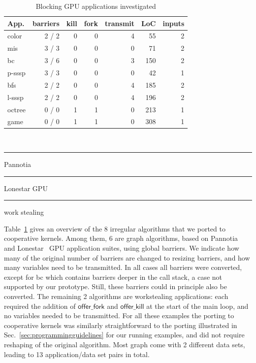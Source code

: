 \documentclass[numbers,nocopyrightspace,10pt]{sigplanconf}
\newcommand\crule[3][black]{\textcolor{#1}{\rule{#2}{#3}}}
\newcommand{\mytablong}{Table~}
\newcommand{\mysec}{Sec.~}
\newcommand{\offerfork}{\mathsf{offer\_fork}}
\newcommand{\offerkill}{\mathsf{offer\_kill}}
\begin{document}
\begin{table}
\small
\centering
\begin{tabular}{ l r r r r r r}
App. & barriers & kill & fork & transmit & LoC & inputs\\
\hline
\rowcolor{Gray1}
color & 2 / 2 & 0 & 0 & 4 & 55 & 2\\
\rowcolor{Gray1}
mis & 3 / 3 & 0 & 0 & 0 & 71 & 2\\
\rowcolor{Gray1}
bc & 3 / 6 & 0 & 0 & 3 & 150 & 2\\
\rowcolor{Gray1}
p-sssp & 3 / 3 & 0 & 0 & 0  & 42 & 1\\
\rowcolor{Gray2}
bfs & 2 / 2 & 0 & 0  & 4  & 185 & 2\\
\rowcolor{Gray2}
l-sssp & 2 / 2 & 0 & 0  & 4  & 196 & 2\\
\rowcolor{Gray3}
octree & 0 / 0 & 1 & 1 & 0 & 213 & 1 \\
\rowcolor{Gray3}
game & 0 / 0 & 1 & 1 & 0 & 308 & 1 \\
\end{tabular} \\
\vspace{.2cm}
\crule[Gray1]{.2cm}{.2cm} Pannotia \hspace{.4cm} \crule[Gray2]{.2cm}{.2cm} Lonestar GPU  \hspace{.4cm}  \crule[Gray3]{.2cm}{.2cm} work stealing
\caption{Blocking GPU applications investigated}
\label{tab:applications}
\end{table}

\mytablong\ref{tab:applications} gives an overview of the 8 irregular
algorithms that we ported to cooperative kernels. Among them, 6 are
graph algorithms, based on Pannotia~\cite{Pannotia} and Lonestar~\cite{BNP12}
GPU application suites, using global barriers.  We indicate how many of
the original number of barriers are changed to resizing barriers, and
how many variables need to be transmitted.  In all cases all barriers
were converted, except for bc which contains barriers deeper in the call
stack, a case not supported by our prototype. Still, these barriers
could in principle also be converted. The remaining 2 algorithms are
workstealing applications: each required the addition of $\offerfork$
and $\offerkill$ at the start of the main loop, and no variables needed
to be transmitted.  For all these examples the porting to cooperative
kernels was similarly straightforward to the porting illustrated in
\mysec\ref{sec:programmingguidelines} for our running examples, and did
not require reshaping of the original algorithm. Most graph come with 2
different data sets, leading to 13 application/data set pairs in total.
\end{document}
